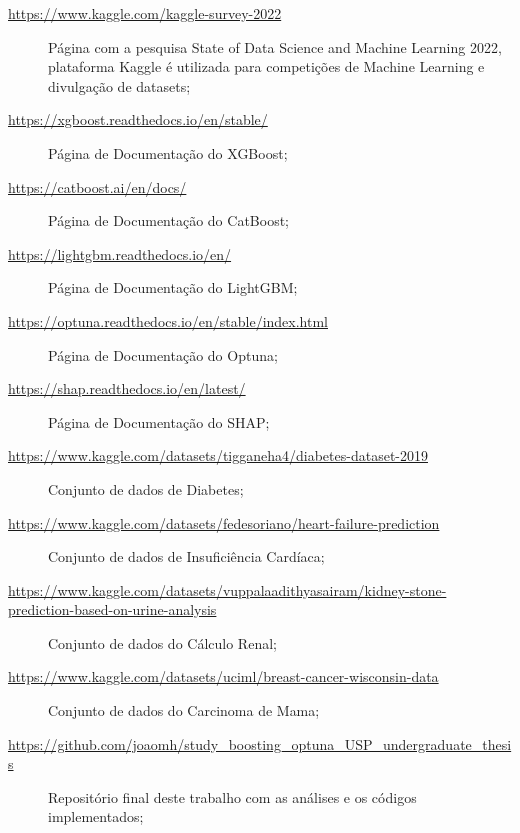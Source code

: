 \begin{description}
 \item[\url{https://www.kaggle.com/kaggle-survey-2022}] Página com a pesquisa State of Data Science and Machine Learning 2022, plataforma Kaggle é utilizada para competições de Machine Learning e divulgação de datasets;
 \item[\url{https://xgboost.readthedocs.io/en/stable/}] Página de Documentação do XGBoost;
 \item[\url{https://catboost.ai/en/docs/}] Página de Documentação do CatBoost;
 \item[\url{https://lightgbm.readthedocs.io/en/}] Página de Documentação do LightGBM;
 \item[\url{https://optuna.readthedocs.io/en/stable/index.html}] Página de Documentação do Optuna;
 \item[\url{https://shap.readthedocs.io/en/latest/}] Página de Documentação do SHAP;
 \item[\url{https://www.kaggle.com/datasets/tigganeha4/diabetes-dataset-2019}] Conjunto de dados de Diabetes;
 \item[\url{https://www.kaggle.com/datasets/fedesoriano/heart-failure-prediction}] Conjunto de dados de Insuficiência Cardíaca;
 \item[\url{https://www.kaggle.com/datasets/vuppalaadithyasairam/kidney-stone-prediction-based-on-urine-analysis}] Conjunto de dados do Cálculo Renal;
 \item[\url{https://www.kaggle.com/datasets/uciml/breast-cancer-wisconsin-data}] Conjunto de dados do Carcinoma de Mama;
\item[\url{https://github.com/joaomh/study_boosting_optuna_USP_undergraduate_thesis}] Repositório final deste trabalho com as análises e os códigos implementados;
 \end{description}